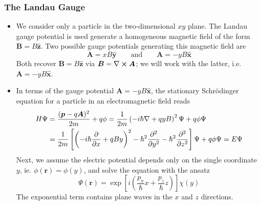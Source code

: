 \documentclass[11pt, a4paper]{article}
\renewcommand{\curl}{\nabla \cross}
\renewcommand{\grad}{\nabla}
\newcommand{\eqtext}[1]{\qquad \text{#1} \qquad}
\newcommand{\Schro}{Schr\"{o}dinger\xspace}
\renewcommand{\vec}[1]{\bm{#1}}  %
\newcommand{\uvec}[1]{\hat{\vec{#1}}}  %
\renewcommand{\r}{\vec{r}}  %
\newcommand{\A}{\vec{A}}  %
\newcommand{\B}{\vec{B}}  %
\renewcommand{\P}{\Psi}  %
\begin{document}
\subsubsection{The Landau Gauge}
\begin{itemize}
	\item We consider only a particle in the two-dimensional $ xy $ plane. The Landau gauge potential is used generate a homogeneous magnetic field of the form $ \B = B \uvec{z} $. Two possible gauge potentials generating this magnetic field are
	\begin{equation*}
		\A = x B \uvec{y} \eqtext{and} \A = - y B \uvec{x}
	\end{equation*}
	Both recover $ \B = B \uvec{z} $ via $ \B = \curl \A $; we will work with the latter, i.e. $ \A = - y B \uvec{x} $.
	
	
	\item In terms of the gauge potential $ \A = - y B \uvec{x} $, the stationary \Schro equation for a particle in an electromagnetic field reads
	\begin{align*}
		H\P &= \frac{(\vec{p} - q\A)^{2}}{2m} + q \phi = \frac{1}{2m} \left(-i\hbar \grad + qyB \right)^{2}\P + q \phi \P \\
		&  =\frac{1}{2m}\left[\left(-i\hbar \pdv{x} + qBy\right)^{2} - \hbar^{2}\pdv[2]{}{y} - \hbar^{2}\pdv[2]{}{z}\right]\P + q\phi \P = E \P
	\end{align*}
	Next, we assume the electric potential depends only on the single coordinate $ y $, ie. $ \phi(\r) = \phi(y) $, and solve the equation with the ansatz
	\begin{equation*}
		\P(\r) = \exp\left[i \left(\frac{p_{x}}{\hbar}x + \frac{p_{z}}{\hbar}z \right)\right]\chi(y)
	\end{equation*}
	The exponential term contains plane waves in the $ x $ and $ z $ directions.
	

\end{itemize}
\end{document}
